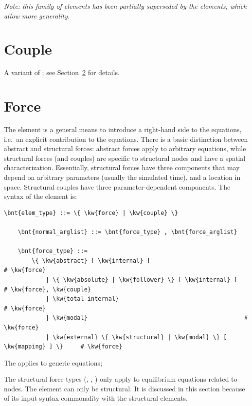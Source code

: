 {\em Note: this family of elements has been partially superseded by the
 elements, which allow more generality.}




\section{Couple}
A variant of ; see Section~\ref{sec:EL:FORCE} for details.







\section{Force}\label{sec:EL:FORCE}
The  element is a general means to introduce 
a right-hand side to the equations, i.e.\ an explicit contribution
to the equations.
There is a basic distinction between abstract and structural forces:
abstract forces apply to arbitrary equations, while structural forces
(and couples) are specific to structural nodes and have
a spatial characterization.
Essentially, structural forces have three components
that may depend on arbitrary parameters (usually the simulated time),
and a location in space.
Structural couples have three parameter-dependent components.
The syntax of the  element is:
\begin{Verbatim}[commandchars=\\\{\}]
    \bnt{elem_type} ::= \{ \kw{force} | \kw{couple} \}

    \bnt{normal_arglist} ::= \bnt{force_type} , \bnt{force_arglist}

    \bnt{force_type} ::=
        \{ \kw{abstract} [ \kw{internal} ]                                 # \kw{force}
            | \{ \kw{absolute} | \kw{follower} \} [ \kw{internal} ]      # \kw{force}, \kw{couple}
            | \kw{total internal}                                     # \kw{force}
            | \kw{modal}                                             # \kw{force}
            | \kw{external} \{ \kw{structural} | \kw{modal} \} [ \kw{mapping} ] \}     # \kw{force}
\end{Verbatim}
The   applies to generic equations;

The structural force types (, , )
only apply to equilibrium equations
related to  nodes.
The  element can only be structural.
It is discussed in this section because of its input syntax commonality 
with the structural  elements.

